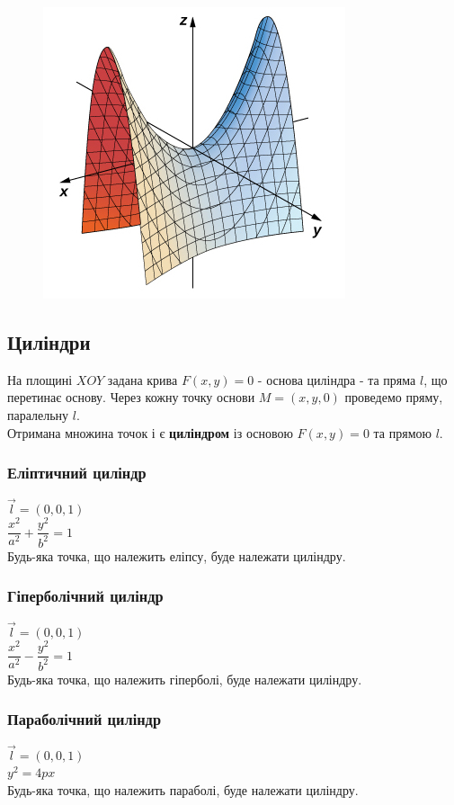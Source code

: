 \documentclass[a4paper, 10pt]{extarticle}
\theoremstyle{theoremdd}
\theoremstyle{theoremdd}
\theoremstyle{theoremdd}
\theoremstyle{theoremdd}
\theoremstyle{theoremdd}
\theoremstyle{theoremdd}
\theoremstyle{theoremdd}
\theoremstyle{theoremdd}
\begin{document}
\begin{figure}[H]
\centering
\includegraphics[scale=1]{hyperbolic-paraboloid.jpeg}
\end{figure}

\subsection{Циліндри}
На площині $XOY$ задана крива $F(x,y) = 0$ - основа циліндра - та пряма $l$, що перетинає основу. Через кожну точку основи $M = (x,y,0)$ проведемо пряму, паралельну $l$.\\
Отримана множина точок і є \textbf{циліндром} із основою $F(x,y) = 0$ та прямою $l$.\\

\subsubsection{Еліптичний циліндр}
$\vec{l} = (0,0,1)$\\
$\dfrac{x^2}{a^2} + \dfrac{y^2}{b^2} = 1$\\
Будь-яка точка, що належить еліпсу, буде належати циліндру.

\subsubsection{Гіперболічний циліндр}
$\vec{l} = (0,0,1)$\\
$\dfrac{x^2}{a^2} - \dfrac{y^2}{b^2} = 1$\\
Будь-яка точка, що належить гіперболі, буде належати циліндру.

\subsubsection{Параболічний циліндр}
$\vec{l} = (0,0,1)$\\
$y^2 = 4px$\\
Будь-яка точка, що належить параболі, буде належати циліндру.
\end{document}
